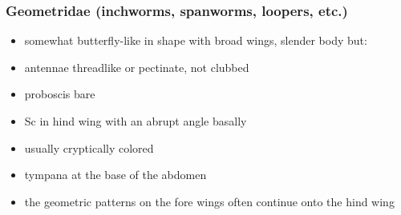 \documentclass[letterpaper, 11pt]{article}
\begin{document}
\subsubsection{Geometridae (inchworms, spanworms, loopers, etc.)}
\begin{itemize}
\item somewhat butterfly-like in shape with broad wings, slender body but:
\item antennae threadlike or pectinate, not clubbed
\item proboscis bare
\item Sc in hind wing with an abrupt angle basally
\item usually cryptically colored
\item tympana at the base of the abdomen
\item the geometric patterns on the fore wings often continue onto the hind wing
\end{itemize}
\end{document}
